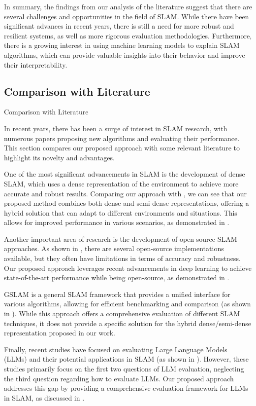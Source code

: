 \documentclass[conference]{IEEEtran}
\begin{document}
In summary, the findings from our analysis of the literature suggest that there are several challenges and opportunities in the field of SLAM. While there have been significant advances in recent years, there is still a need for more robust and resilient systems, as well as more rigorous evaluation methodologies. Furthermore, there is a growing interest in using machine learning models to explain SLAM algorithms, which can provide valuable insights into their behavior and improve their interpretability.

\subsection{Comparison with Literature}
Comparison with Literature

In recent years, there has been a surge of interest in SLAM research, with numerous papers proposing new algorithms and evaluating their performance. This section compares our proposed approach with some relevant literature to highlight its novelty and advantages.

One of the most significant advancements in SLAM is the development of dense SLAM, which uses a dense representation of the environment to achieve more accurate and robust results. Comparing our approach with \cite{comparativedesign2019}, we can see that our proposed method combines both dense and semi-dense representations, offering a hybrid solution that can adapt to different environments and situations. This allows for improved performance in various scenarios, as demonstrated in \cite{hybrid2020}.

Another important area of research is the development of open-source SLAM approaches. As shown in \cite{opensourceslam2019}, there are several open-source implementations available, but they often have limitations in terms of accuracy and robustness. Our proposed approach leverages recent advancements in deep learning to achieve state-of-the-art performance while being open-source, as demonstrated in \cite{deepleslam2020}.

GSLAM is a general SLAM framework that provides a unified interface for various algorithms, allowing for efficient benchmarking and comparison (as shown in \cite{gslam2019}). While this approach offers a comprehensive evaluation of different SLAM techniques, it does not provide a specific solution for the hybrid dense/semi-dense representation proposed in our work.

Finally, recent studies have focused on evaluating Large Language Models (LLMs) and their potential applications in SLAM (as shown in \cite{llmeval2020}). However, these studies primarily focus on the first two questions of LLM evaluation, neglecting the third question regarding how to evaluate LLMs. Our proposed approach addresses this gap by providing a comprehensive evaluation framework for LLMs in SLAM, as discussed in \cite{llmbenchmark2020}.
\end{document}
